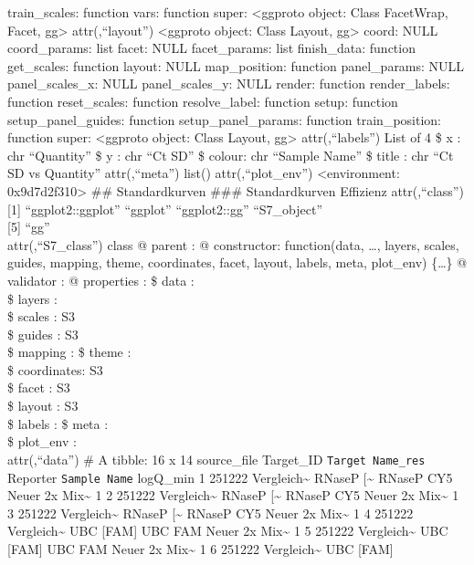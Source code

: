 \documentclass[
]{article}
\begin{document}
train\_scales: function vars: function super: \textless ggproto object:
Class FacetWrap, Facet, gg\textgreater{} attr(,``layout'')
\textless ggproto object: Class Layout, gg\textgreater{} coord: NULL
coord\_params: list facet: NULL facet\_params: list finish\_data:
function get\_scales: function layout: NULL map\_position: function
panel\_params: NULL panel\_scales\_x: NULL panel\_scales\_y: NULL
render: function render\_labels: function reset\_scales: function
resolve\_label: function setup: function setup\_panel\_guides: function
setup\_panel\_params: function train\_position: function super:
\textless ggproto object: Class Layout, gg\textgreater{}
attr(,``labels'') List of 4 \$ x : chr ``Quantity'' \$ y : chr ``Ct SD''
\$ colour: chr ``Sample Name'' \$ title : chr ``Ct SD vs Quantity''
attr(,``meta'') list() attr(,``plot\_env'') \textless environment:
0x9d7d2f310\textgreater{} \n\#\# Standardkurven \n\n\#\#\#
Standardkurven Effizienz \n\n attr(,``class'') {[}1{]}
``ggplot2::ggplot'' ``ggplot'' ``ggplot2::gg'' ``S7\_object''\\
{[}5{]} ``gg''\\
attr(,``S7\_class'') class @ parent : @ constructor: function(data,
\ldots, layers, scales, guides, mapping, theme, coordinates, facet,
layout, labels, meta, plot\_env) \{\ldots\} @ validator : @ properties :
\$ data : \\
\$ layers : \\
\$ scales : S3\\
\$ guides : S3\\
\$ mapping : \$ theme : \\
\$ coordinates: S3\\
\$ facet : S3\\
\$ layout : S3\\
\$ labels : \$ meta : \\
\$ plot\_env : \\
attr(,``data'') \# A tibble: 16 x 14 source\_file Target\_ID
\texttt{Target\ Name\_res} Reporter \texttt{Sample\ Name} logQ\_min 1
251222 Vergleich\textasciitilde{} RNaseP {[}\textasciitilde{} RNaseP CY5
Neuer 2x Mix\textasciitilde{} 1 2 251222 Vergleich\textasciitilde{}
RNaseP {[}\textasciitilde{} RNaseP CY5 Neuer 2x Mix\textasciitilde{} 1 3
251222 Vergleich\textasciitilde{} RNaseP {[}\textasciitilde{} RNaseP CY5
Neuer 2x Mix\textasciitilde{} 1 4 251222 Vergleich\textasciitilde{} UBC
{[}FAM{]} UBC FAM Neuer 2x Mix\textasciitilde{} 1 5 251222
Vergleich\textasciitilde{} UBC {[}FAM{]} UBC FAM Neuer 2x
Mix\textasciitilde{} 1 6 251222 Vergleich\textasciitilde{} UBC {[}FAM{]}
\end{document}
